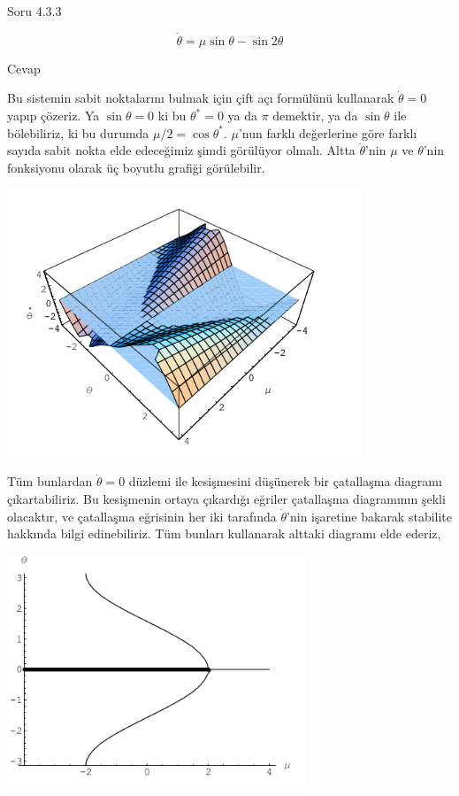 \documentclass[12pt,fleqn]{article}\usepackage{../../common}
\begin{document}
Soru 4.3.3

$$ \dot{\theta} = \mu \sin\theta - \sin 2\theta$$

Cevap

Bu sistemin sabit noktalarını bulmak için çift açı formülünü kullanarak
$\dot{\theta} = 0$ yapıp çözeriz. Ya $\sin \theta = 0$ ki bu $\theta^\ast = 0$ ya
da $\pi$ demektir, ya da $\sin\theta$ ile bölebiliriz, ki bu durumda $\mu/2 =
\cos\theta^\ast$. $\mu$'nun farklı değerlerine göre farklı sayıda sabit nokta elde
edeceğimiz şimdi görülüyor olmalı. Altta $\dot{\theta}$'nin $\mu$ ve
$\theta$'nin fonksiyonu olarak üç boyutlu grafiği görülebilir.

\includegraphics[height=8cm]{12_01.png}

Tüm bunlardan $\dot{\theta}=0$ düzlemi ile kesişmesini düşünerek bir çatallaşma
diagramı çıkartabiliriz. Bu kesişmenin ortaya çıkardığı eğriler çatallaşma
diagramının şekli olacaktır, ve çatallaşma eğrisinin her iki tarafında
$\dot{\theta}$'nin işaretine bakarak stabilite hakkında bilgi edinebiliriz. Tüm
bunları kullanarak alttaki diagramı elde ederiz, 

\includegraphics[height=7cm]{12_02.png}
\end{document}
